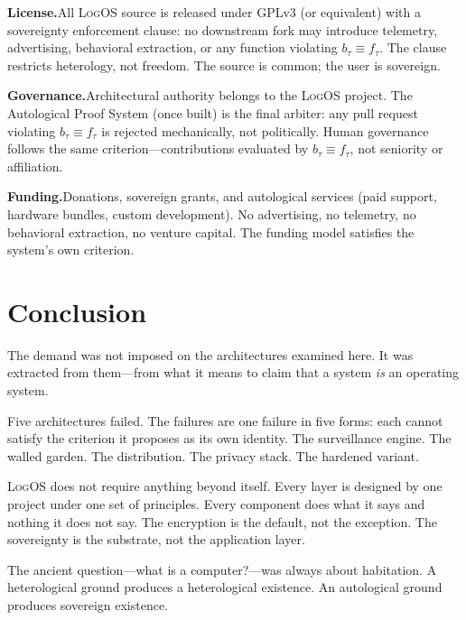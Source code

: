 \documentclass[11pt, oneside]{article}
\newcommand{\LogOS}{\textnormal{\textsc{LogOS}}}
\begin{document}
\noindent\textbf{License.}\quad All \LogOS{} source is released under
GPLv3 (or equivalent) with a sovereignty enforcement clause: no
downstream fork may introduce telemetry, advertising, behavioral
extraction, or any function violating $b_\tau \equiv f_\tau$. The
clause restricts heterology, not freedom. The source is common; the
user is sovereign.

\medskip
\noindent\textbf{Governance.}\quad Architectural authority belongs to the
\LogOS{} project. The Autological Proof System (once built) is the
final arbiter: any pull request violating $b_\tau \equiv f_\tau$ is
rejected mechanically, not politically. Human governance follows the
same criterion---contributions evaluated by $b_\tau \equiv f_\tau$, not
seniority or affiliation.

\medskip
\noindent\textbf{Funding.}\quad Donations, sovereign grants, and
autological services (paid support, hardware bundles, custom
development). No advertising, no telemetry, no behavioral extraction, no
venture capital. The funding model satisfies the system's own criterion.

\section*{Conclusion}

\noindent The demand was not imposed on the architectures examined here.
It was extracted from them---from what it means to claim that a system
\textit{is} an operating system.

Five architectures failed. The failures are one failure in five forms:
each cannot satisfy the criterion it proposes as its own identity. The
surveillance engine. The walled garden. The distribution. The privacy
stack. The hardened variant.

\LogOS{} does not require anything beyond itself. Every layer is
designed by one project under one set of principles. Every component
does what it says and nothing it does not say. The encryption is the
default, not the exception. The sovereignty is the substrate, not the
application layer.

The ancient question---what is a computer?---was always about
habitation. A heterological ground produces a heterological existence.
An autological ground produces sovereign existence.
\end{document}
